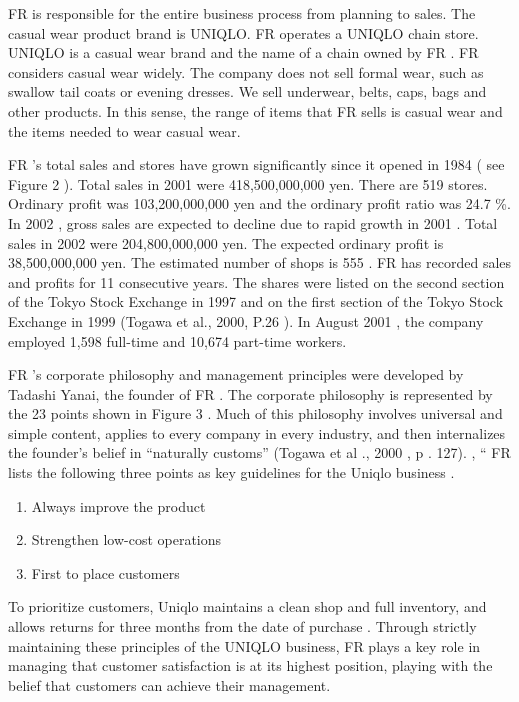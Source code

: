\documentclass[]{article}
\providecommand{\tightlist}{%
  \setlength{\itemsep}{0pt}\setlength{\parskip}{0pt}}
\begin{document}
FR is responsible for the entire business process from planning to
sales. The casual wear product brand is UNIQLO. FR operates a UNIQLO
chain store. UNIQLO is a casual wear brand and the name of a chain owned
by FR . FR considers casual wear widely. The company does not sell
formal wear, such as swallow tail coats or evening dresses. We sell
underwear, belts, caps, bags and other products. In this sense, the
range of items that FR sells is casual wear and the items needed to wear
casual wear.

FR 's total sales and stores have grown significantly since it opened in
1984 ( see Figure 2 ). Total sales in 2001 were 418,500,000,000 yen.
There are 519 stores. Ordinary profit was 103,200,000,000 yen and the
ordinary profit ratio was 24.7 \%. In 2002 , gross sales are expected to
decline due to rapid growth in 2001 . Total sales in 2002 were
204,800,000,000 yen. The expected ordinary profit is 38,500,000,000 yen.
The estimated number of shops is 555 . FR has recorded sales and profits
for 11 consecutive years. The shares were listed on the second section
of the Tokyo Stock Exchange in 1997 and on the first section of the
Tokyo Stock Exchange in 1999 (Togawa et al., 2000, P.26 ). In August
2001 , the company employed 1,598 full-time and 10,674 part-time
workers.

FR 's corporate philosophy and management principles were developed by
Tadashi Yanai, the founder of FR . The corporate philosophy is
represented by the 23 points shown in Figure 3 . Much of this philosophy
involves universal and simple content, applies to every company in every
industry, and then internalizes the founder's belief in ``naturally
customs'' (Togawa et al ., 2000 , p . 127). , `` FR lists the following
three points as key guidelines for the Uniqlo business .

\begin{enumerate}
\def\labelenumi{(\arabic{enumi})}
\tightlist
\item
  Always improve the product
\item
  Strengthen low-cost operations
\item
  First to place customers
\end{enumerate}

To prioritize customers, Uniqlo maintains a clean shop and full
inventory, and allows returns for three months from the date of purchase
. Through strictly maintaining these principles of the UNIQLO business,
FR plays a key role in managing that customer satisfaction is at its
highest position, playing with the belief that customers can achieve
their management.
\end{document}
